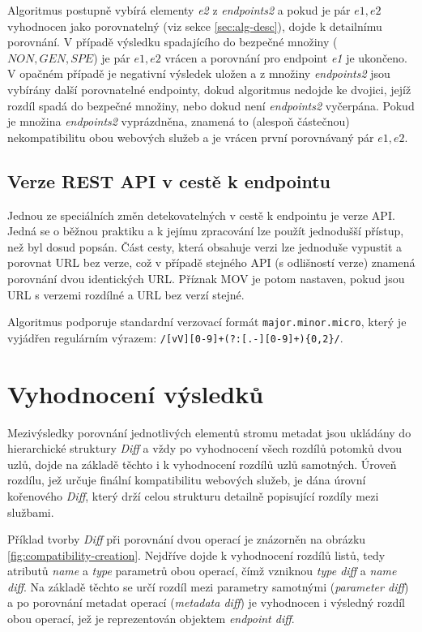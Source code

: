 \documentclass[czech,DP]{thesiskiv}
\begin{document}
Algoritmus postupně vybírá elementy \textit{e2} z \textit{endpoints2} a pokud je pár $e1,e2$ vyhodnocen jako porovnatelný (viz sekce \ref{sec:alg-desc}), dojde k detailnímu porovnání. V případě výsledku spadajícího do bezpečné množiny (${NON, GEN, SPE}$) je pár $e1,e2$ vrácen a porovnání pro endpoint \textit{e1} je ukončeno. V opačném případě je negativní výsledek uložen a z množiny \textit{endpoints2} jsou vybírány další porovnatelné endpointy, dokud algoritmus nedojde ke dvojici, jejíž rozdíl spadá do bezpečné množiny, nebo dokud není \textit{endpoints2} vyčerpána. Pokud je množina \textit{endpoints2} vyprázdněna, znamená to (alespoň částečnou) nekompatibilitu obou webových služeb a je vrácen první porovnávaný pár $e1,e2$.

\subsection{Verze REST API v cestě k endpointu}	
\label{sec:api-path-version}

Jednou ze speciálních změn detekovatelných v cestě k endpointu je verze API. Jedná se o běžnou praktiku \cite{restApiVersion} a k jejímu zpracování lze použít jednodušší přístup, než byl dosud popsán. Část cesty, která obsahuje verzi lze jednoduše vypustit a porovnat URL bez verze, což v případě stejného API (s odlišností verze) znamená porovnání dvou identických URL. Příznak MOV je potom nastaven, pokud jsou URL s verzemi rozdílné a URL bez verzí stejné.

Algoritmus podporuje standardní verzovací formát \verb|major.minor.micro|, který je vyjádřen regulárním výrazem: \verb|/[vV][0-9]+(?:[.-][0-9]+){0,2}/|.

\section{Vyhodnocení výsledků}

Mezivýsledky porovnání jednotlivých elementů stromu metadat jsou ukládány do hierarchické struktury \textit{Diff} a vždy po vyhodnocení všech rozdílů potomků dvou uzlů, dojde na základě těchto i k vyhodnocení rozdílů uzlů samotných. Úroveň rozdílu, jež určuje finální kompatibilitu webových služeb, je dána úrovní kořenového \textit{Diff}, který drží celou strukturu detailně popisující rozdíly mezi službami. 

Příklad tvorby \textit{Diff} při porovnání dvou operací je znázorněn na obrázku \ref{fig:compatibility-creation}. Nejdříve dojde k vyhodnocení rozdílů listů, tedy atributů \textit{name} a \textit{type} parametrů obou operací, čímž vzniknou \textit{type diff} a \textit{name diff}. Na základě těchto se určí rozdíl mezi parametry samotnými (\textit{parameter diff}) a po porovnání metadat operací (\textit{metadata diff}) je vyhodnocen i výsledný rozdíl obou operací, jež je reprezentován objektem \textit{endpoint diff}.
\end{document}
